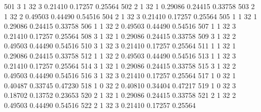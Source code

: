 \documentclass{article}
\begin{document}
\begin{Woutput}
 501      3       1      32       3       0.21410    0.17257    0.25564
 502      2       1      32       1       0.29086    0.24415    0.33758
 503      2       1      32       2       0.49503    0.44490    0.54516
 504      2       1      32       3       0.21410    0.17257    0.25564
 505      1       1      32       1       0.29086    0.24415    0.33758
 506      1       1      32       2       0.49503    0.44490    0.54516
 507      1       1      32       3       0.21410    0.17257    0.25564
 508      3       1      32       1       0.29086    0.24415    0.33758
 509      3       1      32       2       0.49503    0.44490    0.54516
 510      3       1      32       3       0.21410    0.17257    0.25564
 511      1       1      32       1       0.29086    0.24415    0.33758
 512      1       1      32       2       0.49503    0.44490    0.54516
 513      1       1      32       3       0.21410    0.17257    0.25564
 514      3       1      32       1       0.29086    0.24415    0.33758
 515      3       1      32       2       0.49503    0.44490    0.54516
 516      3       1      32       3       0.21410    0.17257    0.25564
 517      1       0      32       1       0.40487    0.33745    0.47230
 518      1       0      32       2       0.40810    0.34404    0.47217
 519      1       0      32       3       0.18702    0.13752    0.23653
 520      2       1      32       1       0.29086    0.24415    0.33758
 521      2       1      32       2       0.49503    0.44490    0.54516
 522      2       1      32       3       0.21410    0.17257    0.25564


\end{Woutput}
\end{document}
